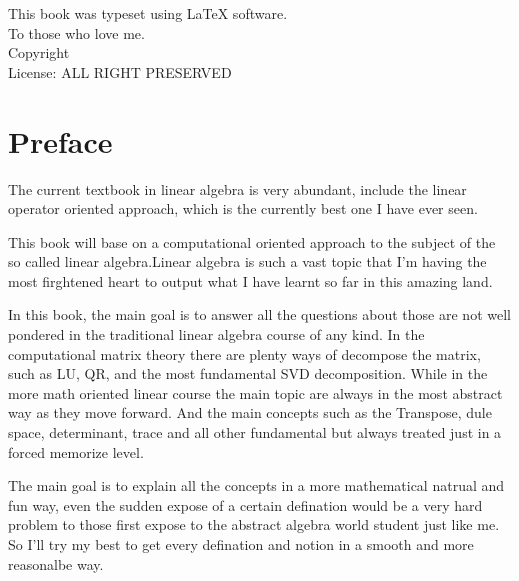 \documentclass{book}
\makeatletter
\newcommand{\booklicense}{ALL RIGHT PRESERVED}
\newcommand{\bookauthor}{\@author}
\newcommand{\prefacePara}
{
The current 
textbook in linear algebra is very abundant, 
include the linear operator oriented approach, 
which is the currently best one I have ever seen.

This book will base on a computational oriented 
approach to the subject of the so called linear
algebra.Linear algebra is such a vast topic that
I'm having the most firghtened heart to output
what I have learnt so far in this amazing land.

In this book, the main goal is to answer all the
questions about those are not well pondered in the
traditional linear algebra course of any kind.
In the computational matrix theory there are plenty
ways of decompose the matrix, such as LU, QR, and the
most fundamental SVD decomposition.
While in the more math oriented linear course
the main topic are always in the most abstract way
as they move forward.
And the main concepts such as the Transpose, dule
space, determinant, trace and all other fundamental
but always treated just in a forced memorize level.

The main goal is to explain all the concepts in a 
more mathematical natrual and fun way, even the sudden
expose of a certain defination would be a very hard
problem to those first expose to the abstract algebra
world student just like me. So I'll try my best to
get every defination and notion in a smooth and more
reasonalbe way. 
}
\makeatother
\begin{document}
\thispagestyle{empty}

\begin{flushleft}
    \vspace*{\fill}
    This book was typeset using \LaTeX{} software.\\
    To those who love me.\\
    \vspace{\fill}
    Copyright \textcopyright{} \the\year{}  \bookauthor\\
    License: \booklicense
\end{flushleft}

\addtocounter{page}{2}

\chapter*{Preface}
\prefacePara{}

\setcounter{tocdepth}{3}
\tableofcontents

\mainmatter
\end{document}
